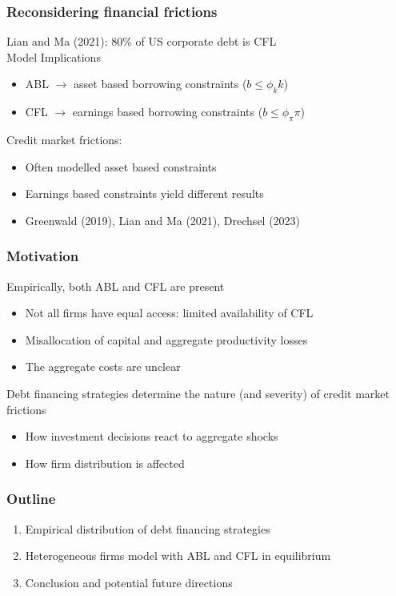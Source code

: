\documentclass[notes]{beamer}
\begin{document}
\begin{frame}
\frametitle{Reconsidering financial frictions}
Lian and Ma (2021): 80\% of US corporate debt is CFL \vspace{5mm} \\
Model Implications
\begin{itemize}
\item ABL $\rightarrow$ asset based borrowing constraints ($b \leq \phi_k k$)
\item CFL $\rightarrow$ earnings based borrowing constraints ($b \leq \phi_\pi \pi$)
\end{itemize} \vspace{3mm} 
Credit market frictions: 
\begin{itemize}
\item Often modelled asset based constraints
\item Earnings based constraints yield different results
\item Greenwald (2019), Lian and Ma (2021), Drechsel (2023)
\end{itemize}

\end{frame}

\begin{frame}
\frametitle{Motivation}
Empirically, both ABL and CFL are present
\begin{itemize}
\item Not all firms have equal access: limited availability of CFL 
\item Misallocation of capital and aggregate productivity losses
\item The aggregate costs are unclear
\end{itemize} \vspace{7mm} 
Debt financing strategies determine the nature (and severity) of credit market frictions
\begin{itemize}
\item How investment decisions react to aggregate shocks
\item How firm distribution is affected
\end{itemize}

\end{frame}


\begin{frame}
\frametitle{Outline}
\begin{enumerate}
\item Empirical distribution of debt financing strategies \vspace{5mm} \\
\item Heterogeneous firms model with ABL and CFL in equilibrium  \vspace{5mm} \\
\item Conclusion and potential future directions
\end{enumerate} 

\end{frame}
\end{document}
